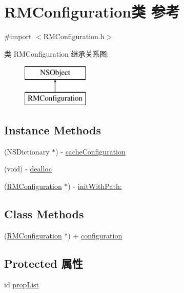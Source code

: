 \hypertarget{interface_r_m_configuration}{\section{R\-M\-Configuration类 参考}
\label{interface_r_m_configuration}
}


{\ttfamily \#import $<$R\-M\-Configuration.\-h$>$}

类 R\-M\-Configuration 继承关系图\-:\begin{figure}[H]
\begin{center}
\leavevmode
\includegraphics[height=2.000000cm]{interface_r_m_configuration}
\end{center}
\end{figure}
\subsection*{Instance Methods}
\begin{DoxyCompactItemize}
\item 
(N\-S\-Dictionary $\ast$) -\/ \hyperlink{interface_r_m_configuration_a7f29693a7f34f51433dda3129174b289}{cache\-Configuration}
\item 
(void) -\/ \hyperlink{interface_r_m_configuration_ad17b0c8a4b544a806b7e0b1d5ce4455d}{dealloc}
\item 
(\hyperlink{interface_r_m_configuration}{R\-M\-Configuration} $\ast$) -\/ \hyperlink{interface_r_m_configuration_a0eec9dc64f99eb0d43fc4a48542d91b0}{init\-With\-Path\-:}
\end{DoxyCompactItemize}
\subsection*{Class Methods}
\begin{DoxyCompactItemize}
\item 
(\hyperlink{interface_r_m_configuration}{R\-M\-Configuration} $\ast$) + \hyperlink{interface_r_m_configuration_ad6414afc2d914f013830974cdf9b9a43}{configuration}
\end{DoxyCompactItemize}
\subsection*{Protected 属性}
\begin{DoxyCompactItemize}
\item 
id \hyperlink{interface_r_m_configuration_a332a23cfb95e619572c9615033e04952}{prop\-List}
\end{DoxyCompactItemize}


